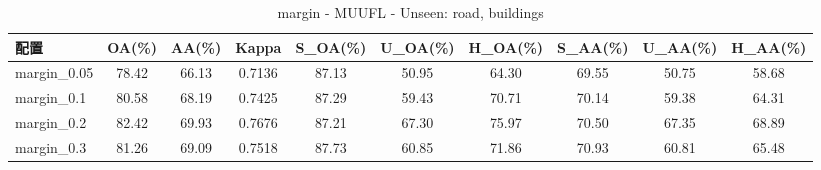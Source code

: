 \begin{table}[htbp]
\centering
\caption{margin - MUUFL - Unseen: road, buildings}
\begin{tabular}{lccccccccc}
\hline
配置 & OA(\%) & AA(\%) & Kappa & S\_OA(\%) & U\_OA(\%) & H\_OA(\%) & S\_AA(\%) & U\_AA(\%) & H\_AA(\%) \\
\hline
margin_0.05 & 78.42 & 66.13 & 0.7136 & 87.13 & 50.95 & 64.30 & 69.55 & 50.75 & 58.68 \\
margin_0.1 & 80.58 & 68.19 & 0.7425 & 87.29 & 59.43 & 70.71 & 70.14 & 59.38 & 64.31 \\
margin_0.2 & 82.42 & 69.93 & 0.7676 & 87.21 & 67.30 & 75.97 & 70.50 & 67.35 & 68.89 \\
margin_0.3 & 81.26 & 69.09 & 0.7518 & 87.73 & 60.85 & 71.86 & 70.93 & 60.81 & 65.48 \\
\hline
\end{tabular}
\end{table}